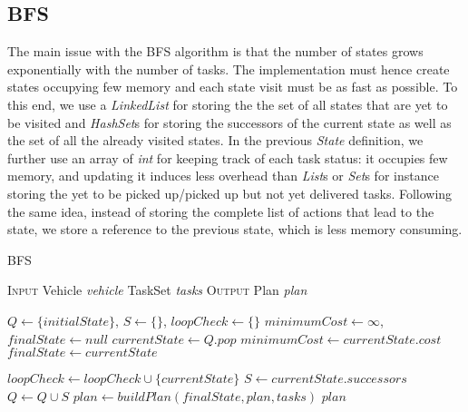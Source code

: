 \documentclass[10pt]{article}
\begin{document}
\subsection{BFS}
The main issue with the BFS algorithm is that the number of states grows exponentially with the number of tasks.
The implementation must hence create states occupying few memory and each state visit must be as fast as possible.
To this end, we use a \textit{LinkedList} for storing the the set of all states that are yet to be visited and \textit{HashSet}s for storing the successors of the current state as well as the set of all the already visited states.
In the previous \textit{State} definition, we further use an array of \textit{int} for keeping track of each task status: it occupies few memory, and updating it induces less overhead than \textit{List}s or \textit{Set}s for instance storing the yet to be picked up/picked up but not yet delivered tasks.
Following the same idea, instead of storing the complete list of actions that lead to the state, we store a reference to the previous state, which is less memory consuming.

\begin{algorithm}[t]
\caption{BFS}
\begin{algorithmic}[1]
\Statex \textsc{Input}
\Statex \hspace{\algorithmicindent} Vehicle \textit{vehicle} 
\Statex \hspace{\algorithmicindent} TaskSet \textit{tasks} 
\Statex \textsc{Output}
\Statex \hspace{\algorithmicindent} Plan \textit{plan} 

\Statex	  
\State $Q \gets \{initialState\}$, $S \gets \{\}$, $loopCheck \gets \{\}$
\State $minimumCost \gets \infty$, $finalState \gets null$ 
	\State $currentState \gets Q.pop$
			\State $minimumCost \gets currentState.cost$
			\State $finalState \gets currentState$
		\EndIf
	\EndIf
	
		\State $loopCheck \gets loopCheck \cup \{currentState\}$
		\State $S \gets currentState.successors$
		\State $Q \gets Q \cup S$
	\EndIf
\EndWhile
\Statex $plan \gets buildPlan(finalState, plan, tasks)$
\State \Return $plan$
\end{algorithmic}
\end{algorithm}
\end{document}
